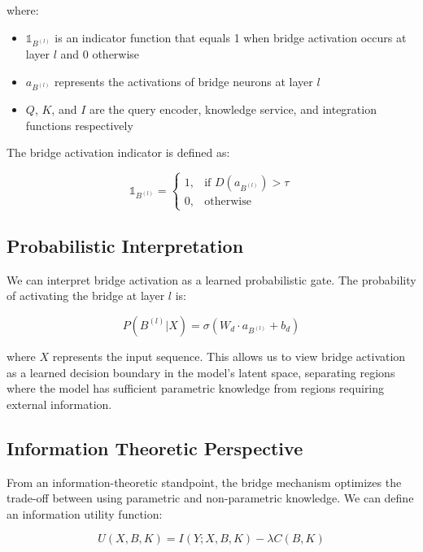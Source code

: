 \documentclass[9pt,a4paper,twocolumn,twoside]{tau-class/tau}
\begin{document}
    where:
    \begin{itemize}
        \item $\mathbb{1}_{B^{(l)}}$ is an indicator function that equals 1 when bridge activation occurs at layer $l$ and 0 otherwise
        \item $a_{B^{(l)}}$ represents the activations of bridge neurons at layer $l$
        \item $Q$, $K$, and $I$ are the query encoder, knowledge service, and integration functions respectively
    \end{itemize}

    The bridge activation indicator is defined as:

    \begin{equation}
    \mathbb{1}_{B^{(l)}} = \begin{cases} 
    1, & \text{if } D(a_{B^{(l)}}) > \tau \\
    0, & \text{otherwise}
    \end{cases}
    \end{equation}

\subsection{Probabilistic Interpretation}

    We can interpret bridge activation as a learned probabilistic gate. The probability of activating the bridge at layer $l$ is:

    \begin{equation}
    P(B^{(l)} | X) = \sigma(W_d \cdot a_{B^{(l)}} + b_d)
    \end{equation}

    where $X$ represents the input sequence. This allows us to view bridge activation as a learned decision boundary in the model's latent space, separating regions where the model has sufficient parametric knowledge from regions requiring external information.

\subsection{Information Theoretic Perspective}

    From an information-theoretic standpoint, the bridge mechanism optimizes the trade-off between using parametric and non-parametric knowledge. We can define an information utility function:

    \begin{equation}
    U(X, B, K) = I(Y; X, B, K) - \lambda C(B, K)
    \end{equation}
\end{document}
